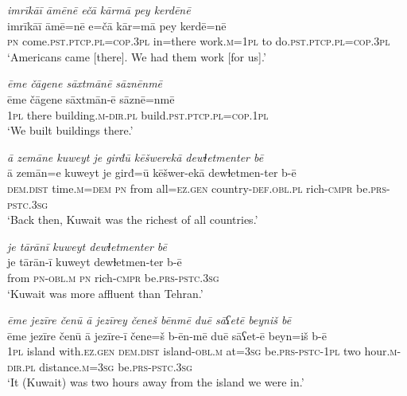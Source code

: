 \ea \label{ŽM.39}
\textit{imrīkāī āmēnē ečā kārmā pey kerdēnē} \\ 
\gll imrīkāī āmē=nē e=čā kār=mā pey kerdē=nē \\ 
 \textsc{pn} come\textsc{.pst}\textsc{.ptcp}\textsc{.pl}\textsc{=cop}\textsc{.3pl} in=there work\textsc{.m}\textsc{=\textsc{1pl}} to do\textsc{.pst}\textsc{.ptcp}\textsc{.pl}\textsc{=cop}\textsc{.3pl} \\ 
\glt `Americans came [there]. We had them work [for us].'
\z 
 
\ea \label{ŽM.40}
\textit{ēme čāgene sāxtmānē sāznēnmē} \\ 
\gll ēme čāgene sāxtmān-ē sāznē=nmē \\ 
 \textsc{1pl} there building\textsc{.m}\textsc{-dir}\textsc{.pl} build\textsc{.pst}\textsc{.ptcp}\textsc{.pl}\textsc{=cop}\textsc{.\textsc{1pl}} \\ 
\glt `We built buildings there.'
\z 
 
\ea \label{ŽM.43}
\textit{ā zemāne kuweyt je girđū kēšwerekā dewɫetmenter bē} \\ 
\gll ā zemān=e kuweyt je girđ=ū kēšwer-ekā dewɫetmen-ter b-ē \\ 
 \textsc{dem.dist} time\textsc{.m}\textsc{=dem} \textsc{pn} from all\textsc{=ez.gen} country\textsc{-def}\textsc{.obl}\textsc{.pl} rich\textsc{-cmpr} be\textsc{.prs}\textsc{-pstc}\textsc{.3sg} \\ 
\glt `Back then, Kuwait was the richest of all countries.'
\z 
 
\ea \label{ŽM.44}
\textit{je tārānī kuweyt dewɫetmenter bē} \\ 
\gll je tārān-ī kuweyt dewɫetmen-ter b-ē \\ 
 from \textsc{pn}\textsc{-obl}\textsc{.m} \textsc{pn} rich\textsc{-cmpr} be\textsc{.prs}\textsc{-pstc}\textsc{.3sg} \\ 
\glt `Kuwait was more affluent than Tehran.'
\z 
 
\ea \label{ŽM.45}
\textit{ēme jezīre čenū ā jezīrey čeneš bēnmē duē sāʕetē beyniš bē} \\ 
\gll ēme jezīre čenū ā jezīre-ī čene=š b-ēn-mē duē sāʕet-ē beyn=iš b-ē \\ 
 \textsc{1pl} island with\textsc{\textsc{.ez}.gen} \textsc{dem.dist} island\textsc{-obl}\textsc{.m} at\textsc{=3sg} be\textsc{.prs}\textsc{-pstc}\textsc{-\textsc{1pl}} two hour\textsc{.m}\textsc{-dir}\textsc{.pl} distance\textsc{.m}\textsc{=3sg} be\textsc{.prs}\textsc{-pstc}\textsc{.3sg} \\ 
\glt `It (Kuwait) was two hours away from the island we were in.'
\z 
 
